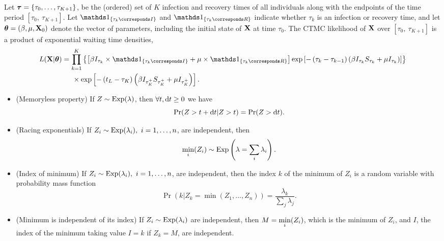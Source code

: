 Let $ \boldsymbol{\tau} = \lbrace\tau_0,\dots,\tau_{K+1}\rbrace $, be the (ordered) set of $ K $ infection and recovery times of all individuals along with the endpoints of the time period $ [\tau_0,\ \tau_{K+1}] $. Let $ \ind{\tau_k \corresponds I} $ and $ \ind{\tau_k \corresponds R} $ indicate whether $ \tau_k $ is an infection or recovery time, and let $ \boldsymbol{\theta} = (\beta, \mu, \mathbf{X}_0) $ denote the vector of parameters, including the initial state of $ \mathbf{X} $ at time $ \tau_0 $. The CTMC likelihood of $ \mathbf{X} $ over $ [\tau_0,\ \tau_{K+1}] $ is a product of exponential waiting time densities,
\begin{align} 
\label{eqn:sir_subj_likelihood}
L(\bX| \btheta) &= \prod_{k = 1}^{K}\left \lbrace \left [\beta I_{\tau_k}\times\ind{\tau_k \corresponds I} + \mu\times\ind{\tau_k \corresponds R}\right ] \exp{\left [-\left (\tau_k - \tau_{k-1}\right )\left (\beta I_{\tau_k} S_{\tau_k} + \mu I_{\tau_k}\right )\right ]}\right \rbrace \nonumber \\
& \hspace{0.2in} \times \exp \left [-\left (t_L - \tau_K\right )\left (\beta I_{\tau_K^+}S_{\tau_K^+} + \mu I_{\tau_K^+}\right )\right ]. 
\end{align}

\begin{framed}
	\begin{itemize}
		\begin{lstlisting}[caption={Useful properties of exponential random variables.},label={list:exp_props}]
		\end{lstlisting}
		\item (Memoryless property) If $ Z\sim\mathrm{Exp}(\lambda)$, then $ \forall t,\mathrm{d} t\geq0 $  we have \begin{equation}\label{eqn:memoryless_prop}
		\Pr(Z > t+\mathrm{d} t | Z>t) = \Pr(Z>\mathrm{d} t).
		\end{equation}
		\item (Racing exponentials) If $ Z_i\sim\mathrm{Exp}(\lambda_i),\ i=1,\dots,n $, are independent, then \begin{equation}\label{eqn:racing_exponentials}
		\underset{i}{\mathrm{min}}(Z_i) \sim \mathrm{Exp}\left (\lambda = \sum_i\lambda_i\right ).
		\end{equation}
		\item (Index of minimum) If $ Z_i\sim\mathrm{Exp}(\lambda_i),\ i=1,\dots,n $, are independent, then the index $ k $ of the minimum of $ Z_i $ is a random variable with probability mass function \begin{equation}\label{eqn:ind_of_min}
		\Pr(k|Z_k = \min(Z_1,\dots,Z_n)) = \frac{\lambda_k}{\sum_j\lambda_j}.
		\end{equation} 
		\item (Minimum is independent of its index) If $ Z_i\sim \mathrm{Exp}(\lambda_i)$ are independent, then $ M = \underset{i}{\mathrm{min}}(Z_i) $, which is the minimum of $ Z_i $, and $ I $, the index of the minimum taking value $ I=k $ if $ Z_k=M$, are independent.
	\end{itemize}
\end{framed}

